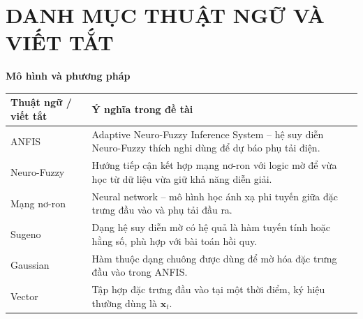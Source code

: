 \chapter*{DANH MỤC THUẬT NGỮ VÀ VIẾT TẮT}

\begingroup
\small
\renewcommand{\arraystretch}{1.15}
\setlength{\tabcolsep}{6pt}

\newcommand{\TermTypeTable}[2]{%
  \vspace{0.6em}
  {\color{HeadingTwoColor}\bfseries #1}\par
  \vspace{0.25em}
  \noindent\begin{tabularx}{\textwidth}{>{\raggedright\arraybackslash}p{4.8cm} >{\raggedright\arraybackslash}X}
    \toprule
    \textbf{Thuật ngữ / viết tắt} & \textbf{Ý nghĩa trong đề tài} \\
    \midrule
    #2
    \bottomrule
  \end{tabularx}
  \par\vspace{0.45em}
}

\TermTypeTable{Mô hình và phương pháp}{
  ANFIS & Adaptive Neuro-Fuzzy Inference System -- hệ suy diễn Neuro-Fuzzy thích nghi dùng để dự báo phụ tải điện. \\
  Neuro-Fuzzy & Hướng tiếp cận kết hợp mạng nơ-ron với logic mờ để vừa học từ dữ liệu vừa giữ khả năng diễn giải. \\
  Mạng nơ-ron & Neural network -- mô hình học ánh xạ phi tuyến giữa đặc trưng đầu vào và phụ tải đầu ra. \\
  Sugeno & Dạng hệ suy diễn mờ có hệ quả là hàm tuyến tính hoặc hằng số, phù hợp với bài toán hồi quy. \\
  Gaussian & Hàm thuộc dạng chuông được dùng để mờ hóa đặc trưng đầu vào trong ANFIS. \\
  Vector & Tập hợp đặc trưng đầu vào tại một thời điểm, ký hiệu thường dùng là $\mathbf{x}_t$. \\
}

